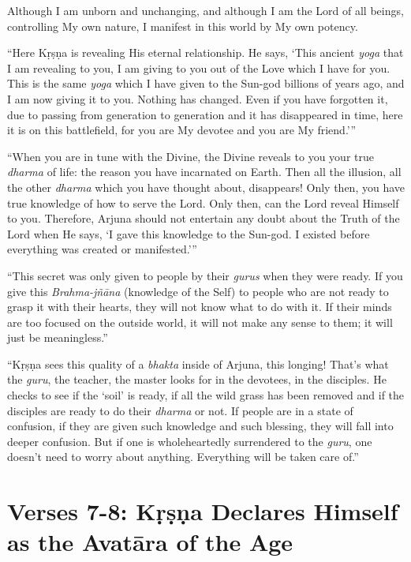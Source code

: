 {Although I am unborn and unchanging, and although I am the Lord of all beings, controlling My own nature, I manifest in this world by My own potency.}

\enquote{Here Kṛṣṇa is revealing His eternal relationship. He says, \enquote{This ancient \textit{yoga} that I am revealing to you, I am giving to you out of the Love which I have for you. This is the same \textit{yoga} which I have given to the Sun-god billions of years ago, and I am now giving it to you. Nothing has changed. Even if you have forgotten it, due to passing from generation to generation and it has disappeared in time, here it is on this battlefield, for you are My devotee and you are My friend.}}

\enquote{When you are in tune with the Divine, the Divine reveals to you your true \textit{dharma} of life: the reason you have incarnated on Earth. Then all the illusion, all the other \textit{dharma} which you have thought about, disappears! Only then, you have true knowledge of how to serve the Lord. Only then, can the Lord reveal Himself to you. Therefore, Arjuna should not entertain any doubt about the Truth of the Lord when He says, \enquote{I gave this knowledge to the Sun-god. I existed before everything was created or manifested.}}

\enquote{This secret was only given to people by their \textit{gurus} when they were ready. If you give this \textit{Brahma-jñāna} (knowledge of the Self) to people who are not ready to grasp it with their hearts, they will not know what to do with it. If their minds are too focused on the outside world, it will not make any sense to them; it will just be meaningless.}

\enquote{Kṛṣṇa sees this quality of a \textit{bhakta} inside of Arjuna, this longing! That’s what the \textit{guru}, the teacher, the master looks for in the devotees, in the disciples. He checks to see if the \enquote{soil} is ready, if all the wild grass has been removed and if the disciples are ready to do their \textit{dharma} or not. If people are in a state of confusion, if they are given such knowledge and such blessing, they will fall into deeper confusion. But if one is wholeheartedly surrendered to the \textit{guru}, one doesn’t need to worry about anything. Everything will be taken care of.}

\section{Verses 7-8: Kṛṣṇa Declares Himself as the Avatāra of the Age}\label{sec-verses-7-8-krsna-declares-himself-as-the-avatara-of-the-age}

